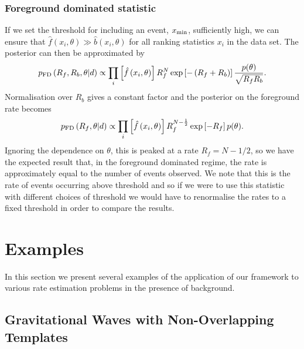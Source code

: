 \documentclass[aps,prd]{revtex4-1}
\begin{document}
\subsubsection{Foreground dominated statistic}
If we set the threshold for including an event, $x_{\rm min}$, sufficiently high, we can ensure that $\hat{f}(x_i,\theta) \gg \hat{b}(x_i,\theta)$ for all ranking statistics $x_i$ in the data set. The posterior can then be approximated by
\begin{equation}
p_{\rm FD}\left( R_f, R_b, \theta | d \right) \propto  \prod_{i} \left[ \hat{f}\left(x_i, \theta\right)\right] R_f^N \exp\left[-\left( R_f + R_b \right) \right] \frac{p(\theta)}{\sqrt{R_f R_b}}.
\end{equation}
Normalisation over $R_b$ gives a constant factor and the posterior on the foreground rate becomes
\begin{equation}
p_{\rm FD}\left( R_f, \theta | d \right) \propto  \prod_{i} \left[ \hat{f}\left(x_i, \theta\right)\right] R_f^{N-\frac{1}{2}} \exp\left[-R_f  \right] p(\theta).
\end{equation}
Ignoring the dependence on $\theta$, this is peaked at a rate $R_f = N-1/2$, so we have the expected result that, in the foreground dominated regime, the rate is approximately equal to the number of events observed. We note that this is the rate of events occurring above threshold and so if we were to use this statistic with different choices of threshold we would have to renormalise the rates to a fixed threshold in order to compare the results. 

\section{Examples}
\label{sec:GW-example}

In this section we present several examples of the application of our
framework to various rate estimation problems in the presence of
background.

\subsection{Gravitational Waves with Non-Overlapping Templates}
\label{sec:analytic-GW-example}
\end{document}
